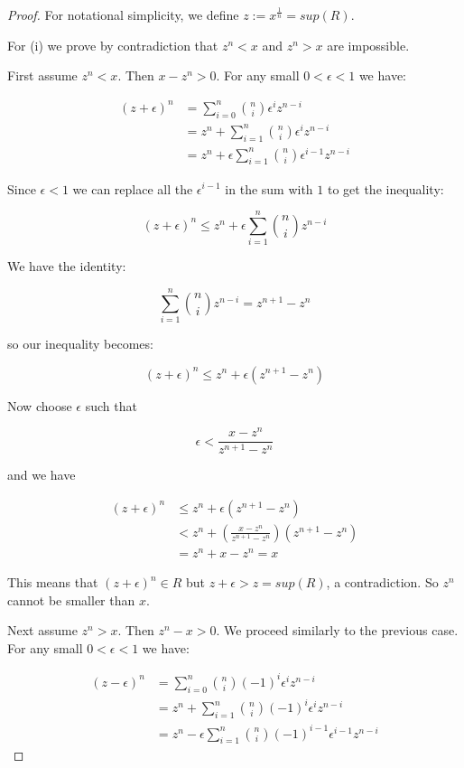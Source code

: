 \begin{proof}

For notational simplicity, we define $z := x^{\frac{1}{n}} = sup(R)$.

For (i) we prove by contradiction that $z^n < x$ and $z^n > x$ are impossible.

First assume $z^n < x$. Then $x - z^n > 0$. For any small $0 < \epsilon < 1$ we have:

\begin{align*}
(z + \epsilon)^n &= \sum_{i = 0}^n \binom{n}{i} \epsilon^i z^{n - i} \\
                 &= z^n + \sum_{i = 1}^n \binom{n}{i} \epsilon^i z^{n - i} \\
                 &= z^n + \epsilon \sum_{i = 1}^n \binom{n}{i} \epsilon^{i-1} z^{n - i}
\end{align*}

Since $\epsilon < 1$ we can replace all the $\epsilon^{i-1}$ in the sum with $1$ to get the inequality:

$$
(z + \epsilon)^n \leq z^n + \epsilon \sum_{i = 1}^n \binom{n}{i} z^{n - i}
$$

We have the identity:

$$
\sum_{i = 1}^n \binom{n}{i} z^{n - i} = z^{n+1} - z^n
$$

so our inequality becomes:

$$
(z + \epsilon)^n \leq z^n + \epsilon (z^{n+1} - z^n)
$$

Now choose $\epsilon$ such that

$$
\epsilon < \frac{x - z^n}{z^{n+1} - z^n}
$$

and we have

\begin{align*}
(z + \epsilon)^n &\leq z^n + \epsilon (z^{n+1} - z^n) \\
                 &< z^n + (\frac{x - z^n}{z^{n+1} - z^n}) (z^{n+1} - z^n) \\
                 &= z^n + x - z^n = x
\end{align*}

This means that $(z + \epsilon)^n \in R$ but $z + \epsilon > z = sup(R)$, a contradiction. So $z^n$ cannot be smaller than $x$.

Next assume $z^n > x$. Then $z^n - x > 0$. We proceed similarly to the previous case. For any small $0 < \epsilon < 1$ we have:

\begin{align*}
(z - \epsilon)^n &= \sum_{i = 0}^n \binom{n}{i} (-1)^i \epsilon^i z^{n - i} \\
                 &= z^n + \sum_{i = 1}^n \binom{n}{i} (-1)^i \epsilon^i z^{n - i} \\
                 &= z^n - \epsilon \sum_{i = 1}^n \binom{n}{i} (-1)^{i-1} \epsilon^{i-1} z^{n - i}
\end{align*}


\end{proof}
